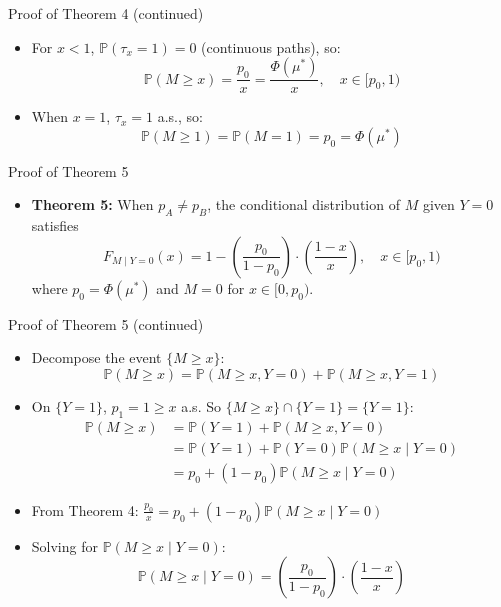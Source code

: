 \documentclass{beamer}
\renewcommand{\P}{\mathbb{P}}
\begin{document}
\begin{frame}{Proof of Theorem 4 (continued)}
\begin{itemize}
  \item For $x < 1$, $\P(\tau_x = 1) = 0$ (continuous paths), so:
  \begin{equation*}
    \P(M \geq x) = \frac{p_0}{x} = \frac{\Phi(\mu^*)}{x}, \quad x \in [p_0, 1)
  \end{equation*}
  \item When $x = 1$, $\tau_x = 1$ a.s., so:
  \begin{equation*}
    \P(M \geq 1) = \P(M = 1) = p_0 = \Phi(\mu^*)
  \end{equation*}
\end{itemize}
\end{frame}

\begin{frame}{Proof of Theorem 5}
\begin{itemize}
  \item \textbf{Theorem 5:} When $p_A \neq p_B$, the conditional distribution of $M$ given $Y = 0$ satisfies
  \begin{equation*}
    F_{M \mid Y = 0}(x) = 1 - \left(\frac{p_0}{1-p_0}\right) \cdot \left(\frac{1 - x}{x}\right), \quad x \in [p_0, 1)
  \end{equation*}
  where $p_0 = \Phi(\mu^*)$ and $M = 0$ for $x \in [0, p_0)$.
\end{itemize}
\end{frame}

\begin{frame}{Proof of Theorem 5 (continued)}
\begin{itemize}
  \item Decompose the event $\{M \geq x\}$:
  \begin{equation*}
    \P(M \geq x) = \P(M \geq x, Y = 0) + \P(M \geq x, Y = 1)
  \end{equation*}
  \item On $\{Y = 1\}$, $p_1 = 1 \geq x$ a.s. So $\{M \geq x\} \cap \{Y = 1\} = \{Y = 1\}$:
  \begin{align*}
    \P(M \geq x) &= \P(Y = 1) + \P(M \geq x, Y = 0) \\
    &= \P(Y = 1) + \P(Y = 0)\P(M \geq x \mid Y = 0) \\
    &= p_0 + (1 - p_0)\P(M \geq x \mid Y = 0)
  \end{align*}
  \item From Theorem 4: $\frac{p_0}{x} = p_0 + (1 - p_0)\P(M \geq x \mid Y = 0)$
  \item Solving for $\P(M \geq x \mid Y = 0)$:
  \begin{equation*}
    \P(M \geq x \mid Y = 0) = \left(\frac{p_0}{1-p_0}\right) \cdot \left(\frac{1 - x}{x}\right)
  \end{equation*}
\end{itemize}
\end{frame}
\end{document}
